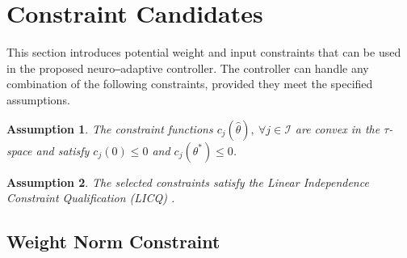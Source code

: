 \documentclass[lettersize,journal]{IEEEtran}
\newtheorem{assum}{Assumption}
\begin{document}
 \section{Constraint Candidates}\label{sec:cstr candidates} 

This section introduces potential weight and input constraints that can be used in the proposed neuro‒adaptive controller. The controller can handle any combination of the following constraints, provided they meet the specified assumptions.

\begin{assum}
    The constraint functions $c_j(\hat\theta),\ \forall j\in\mathcal I$ are convex in the $\tau$-space and satisfy $c_j(0) \le 0$ and $c_j(\theta^*)\le 0$.
    \label{assum1}
\end{assum}



\begin{assum}
    The selected constraints satisfy the Linear Independence Constraint Qualification (LICQ) \cite[Chap.~12 Def.~12.1]{RN22}.
    \label{assum2}
\end{assum}

\subsection{Weight Norm Constraint}\label{sec:cstr weight ball}
\end{document}
